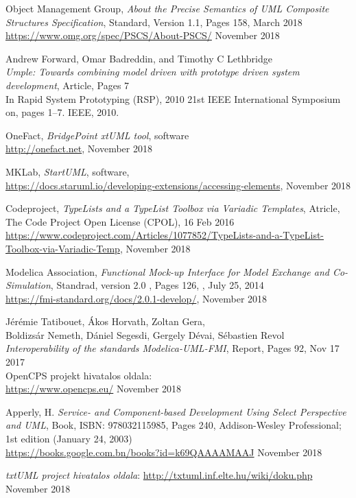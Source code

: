 \documentclass[a4paper,12pt]{report}
\begin{document}
\begin{thebibliography}{4}
	Object Management Group, \emph{About the Precise Semantics of UML Composite Structures Specification}, Standard, Version 1.1, Pages 158, March 2018\\
	\url{https://www.omg.org/spec/PSCS/About-PSCS/} November 2018
	
	Andrew Forward, Omar Badreddin, and Timothy C Lethbridge \\
	\emph{Umple: Towards combining model driven with prototype driven system development}, Article, Pages 7 \\
	In Rapid System Prototyping (RSP), 2010 21st IEEE International Symposium on, pages 1–7. IEEE, 2010.

	OneFact, \emph{BridgePoint xtUML tool}, software \\
	\url{http://onefact.net}, November 2018
	
	MKLab,  \emph{StartUML}, software, \\
	\url{https://docs.staruml.io/developing-extensions/accessing-elements}, November 2018
	
	Codeproject, \emph{TypeLists and a TypeList Toolbox via Variadic Templates}, Atricle,  The Code Project Open License (CPOL), 16 Feb 2016
	\url{https://www.codeproject.com/Articles/1077852/TypeLists-and-a-TypeList-Toolbox-via-Variadic-Temp},
	November 2018
	
	Modelica Association, 
	\emph{Functional Mock-up Interface for Model Exchange and Co-Simulation}, 
	Standrad, version 2.0 , Pages 126, , July 25, 2014  \\
	\url{https://fmi-standard.org/docs/2.0.1-develop/}, November 2018
	
	Jérémie Tatibouet, Ákos Horvath, Zoltan Gera, \\
	Boldizsár Nemeth, Dániel Segesdi, Gergely Dévai, Sébastien Revol \\
	\emph{Interoperability of the standards Modelica-UML-FMI}, Report, Pages 92, Nov 17 2017 \\
	
	OpenCPS projekt hivatalos oldala: \\
	\url{https://www.opencps.eu/} November 2018
	
  Apperly, H.
  \emph{Service- and Component-based Development Using Select Perspective and UML}, Book, ISBN: 978032115985, Pages 240, Addison-Wesley Professional; 1st edition (January 24, 2003) \\
  \url{https://books.google.com.bn/books?id=k69QAAAAMAAJ} November 2018
  
	\emph{txtUML project hivatalos oldala}: \url{http://txtuml.inf.elte.hu/wiki/doku.php} November 2018
	
	
\end{thebibliography}
\end{document}
